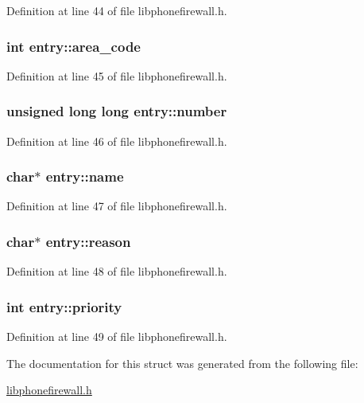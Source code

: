 Definition at line 44 of file libphonefirewall.h.\hypertarget{structentry_0e8fbe135bf7735f8675b6829ac943c3}{
\subsubsection{\setlength{\rightskip}{0pt plus 5cm}int {\bf entry::area\_\-code}}}
\label{structentry_0e8fbe135bf7735f8675b6829ac943c3}




Definition at line 45 of file libphonefirewall.h.\hypertarget{structentry_ba7411d38f6779700ca594ebb2db3201}{
\subsubsection{\setlength{\rightskip}{0pt plus 5cm}unsigned long long {\bf entry::number}}}
\label{structentry_ba7411d38f6779700ca594ebb2db3201}




Definition at line 46 of file libphonefirewall.h.\hypertarget{structentry_ef8962564a1a313a7ddc320bb4ed739c}{
\subsubsection{\setlength{\rightskip}{0pt plus 5cm}char$\ast$ {\bf entry::name}}}
\label{structentry_ef8962564a1a313a7ddc320bb4ed739c}




Definition at line 47 of file libphonefirewall.h.\hypertarget{structentry_1bcaeeed116744379db6ff5c671856a2}{
\subsubsection{\setlength{\rightskip}{0pt plus 5cm}char$\ast$ {\bf entry::reason}}}
\label{structentry_1bcaeeed116744379db6ff5c671856a2}




Definition at line 48 of file libphonefirewall.h.\hypertarget{structentry_65a11c5accccc3ac72247a12d53098d1}{
\subsubsection{\setlength{\rightskip}{0pt plus 5cm}int {\bf entry::priority}}}
\label{structentry_65a11c5accccc3ac72247a12d53098d1}




Definition at line 49 of file libphonefirewall.h.

The documentation for this struct was generated from the following file:\begin{CompactItemize}
\item 
\hyperlink{libphonefirewall_8h}{libphonefirewall.h}\end{CompactItemize}
